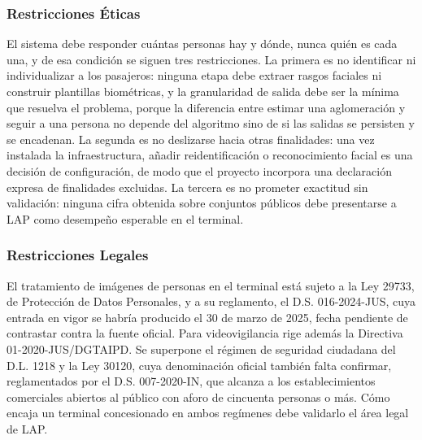 %
%


\subsubsection{Restricciones Éticas}

El sistema debe responder cuántas personas hay y dónde, nunca quién es
cada una, y de esa condición se siguen tres restricciones. La primera es
no identificar ni individualizar a los pasajeros: ninguna etapa debe
extraer rasgos faciales ni construir plantillas biométricas, y la
granularidad de salida debe ser la mínima que resuelva el problema,
porque la diferencia entre estimar una aglomeración y seguir a una
persona no depende del algoritmo sino de si las salidas se persisten y
se encadenan. La segunda es no deslizarse hacia otras finalidades: una
vez instalada la infraestructura, añadir reidentificación o
reconocimiento facial es una decisión de configuración, de modo que el
proyecto incorpora una declaración expresa de finalidades excluidas. La
tercera es no prometer exactitud sin validación: ninguna cifra obtenida
sobre conjuntos públicos debe presentarse a LAP como desempeño esperable
en el terminal.

\subsubsection{Restricciones Legales}
\label{sec:marco}
\label{sec:directiva}
\label{sec:dl1218}
\label{sec:proporcionalidad}
\label{sec:auditoria}
\label{sec:licencias}

El tratamiento de imágenes de personas en el terminal está sujeto a la
Ley 29733, de Protección de Datos Personales, y a su reglamento, el D.S.
016-2024-JUS, cuya entrada en vigor se habría producido el 30 de marzo
de 2025, fecha pendiente de contrastar contra la fuente oficial.
 Para
videovigilancia rige además la Directiva 01-2020-JUS/DGTAIPD. Se
superpone el régimen de seguridad ciudadana del D.L. 1218 y la Ley
30120, cuya denominación oficial también falta confirmar, reglamentados
por el D.S. 007-2020-IN, que alcanza a los establecimientos comerciales
abiertos al público con aforo de cincuenta personas o más.
 Cómo encaja un terminal
concesionado en ambos regímenes debe validarlo el área legal de LAP.

